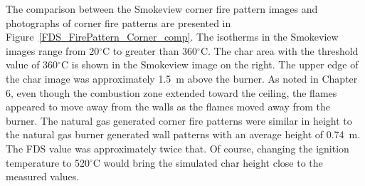 \documentclass[twoside]{uocthesis}
\begin{document}
{The comparison between the Smokeview corner fire pattern images and photographs of corner fire patterns are presented in Figure~\ref{FDS_FirePattern_Corner_comp}.  The isotherms in the Smokeview images range from 20$^\circ$C to greater than 360$^\circ$C.  The char area with the threshold value of 360$^\circ$C is shown in the Smokeview image on the right.  The upper edge of the char image was approximately 1.5~m above the burner.  As noted in Chapter 6, even though the combustion zone extended toward the ceiling, the flames appeared to move away from the walls as the flames moved away from the burner.  The natural gas generated corner fire patterns were similar in height to the natural gas burner generated wall patterns with an average height of 0.74~m.  The FDS value was approximately twice that.  Of course, changing the ignition temperature to 520$^\circ$C would bring the simulated char height close to the measured values.

}
\end{document}
